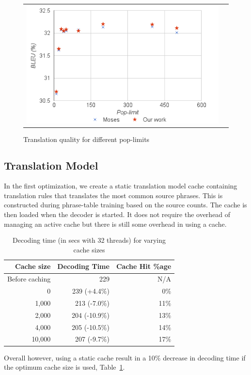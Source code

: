 \documentclass[]{article}
\begin{document}
\begin{figure}[h]
\centering
\begin{tabular}{cc}
{\includegraphics[scale=0.5]{bleu.png}} 
\end{tabular}
\caption{Translation quality for different pop-limits}
\label{fig:bleu}
\end{figure} 

\subsection{Translation Model}

In the first optimization, we create a static translation model cache containing translation rules that translates the most common source phrases. This is constructed during phrase-table training based on the source counts. The cache is then loaded when the decoder is started. It does not require the overhead of managing an active cache but there is still some overhead in using a cache. 
\begin{table}[h]
\small
\begin{center}
\begin{tabular}{|r|r|r|} \hline
Cache size	& Decoding Time & Cache Hit \%age	\\ \hline
Before caching	& 229	& N/A	 \\
0		& 239 (+4.4\%)	& 0\% \\
1,000		& 213 (-7.0\%)	& 11\% \\
2,000		& 204 (-10.9\%)	& 13\% \\
4,000		& 205 (-10.5\%)	& 14\% \\
10,000		& 207 (-9.7\%)	& 17\% \\ \hline
\end{tabular}
\end{center}
\caption{Decoding time (in secs with 32 threads) for varying cache sizes}
\label{tab:cache}
\end{table}
Overall however, using a static cache result in a 10\% decrease in decoding time if the optimum cache size is used, Table~\ref{tab:cache}.
\end{document}
